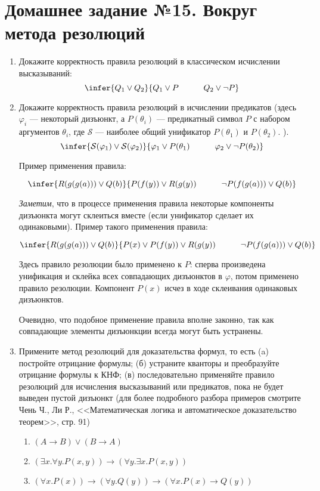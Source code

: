 \documentclass[10pt,a4paper,oneside]{article}
\begin{document}
\section*{Домашнее задание №15. Вокруг метода резолюций}
\begin{enumerate}
\item Докажите корректность правила резолюций в классическом исчислении высказываний:
$$\infer{Q_1 \vee Q_2}{Q_1 \vee P \quad\quad\quad Q_2 \vee \neg P}$$
\item Докажите корректность правила резолюций в исчислении предикатов (здесь $\varphi_i$ --- некоторый
дизъюнкт, а $P(\theta_i)$ --- предикатный символ $P$ с набором аргументов $\theta_i$,
где $\mathcal{S}$ --- наиболее общий унификатор $P(\theta_1)$ и $P(\theta_2)$.
).
$$\infer{\mathcal{S}(\varphi_1) \vee \mathcal{S}(\varphi_2)}{\varphi_1 \vee P(\theta_1) \quad\quad\quad \varphi_2 \vee \neg P(\theta_2)}$$

Пример применения правила:

$$\infer{R(g(g(a))) \vee Q(b)}{P(f(y)) \vee R(g(y)) \quad\quad\quad \neg P(f(g(a))) \vee Q(b)}$$

\emph{Заметим}, что в процессе применения правила некоторые компоненты дизъюнкта могут склеиться вместе (если унификатор сделает их одинаковыми).
Пример такого применения правила:

$$\infer{R(g(g(a))) \vee Q(b)}{P(x) \vee P(f(y)) \vee R(g(y)) \quad\quad\quad \neg P(f(g(a))) \vee Q(b)}$$

Здесь правило резолюции было применено к $P$: сперва произведена унификация и склейка всех совпадающих
дизъюнктов в $\varphi$, потом применено правило резолюции. Компонент $P(x)$ исчез в ходе склеивания одинаковых дизъюнктов.

Очевидно, что подобное применение правила вполне законно, так как совпадающие элементы дизъюнкции всегда могут быть устранены.

\item Примените метод резолюций для доказательства формул, то есть (a) постройте отрицание формулы; (б) устраните кванторы
и преобразуйте отрицание формулы к КНФ; (в) последовательно применяйте правило
резолюций для исчисления высказываний или предикатов, пока не будет
выведен пустой дизъюнкт (для более подробного разбора примеров смотрите Чень Ч., Ли Р.,
<<Математическая логика и автоматическое доказательство теорем>>, стр. 91)
\begin{enumerate}
\item $(A \rightarrow B) \vee (B\rightarrow A)$
\item $(\exists x.\forall y.P(x,y)) \rightarrow (\forall y.\exists x.P(x,y))$
\item $(\forall x.P(x)) \rightarrow (\forall y.Q(y)) \rightarrow (\forall x.P(x) \rightarrow Q(y))$
\end{enumerate}


\end{enumerate}
\end{document}
